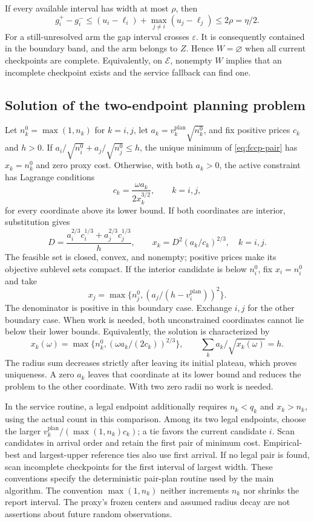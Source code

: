 \documentclass[11pt]{article}
\theoremstyle{remark}
\begin{document}
If every available interval has width at most $\rho$, then
\[
 g_i^+-g_i^-\le(u_i-\ell_i)+
                  \max_{j\ne i}(u_j-\ell_j)\le2\rho=\eta/2.
\]
For a still-unresolved arm the gap interval crosses $\varepsilon$.
It is consequently contained in the boundary band, and the arm belongs
to $Z$. Hence $W=\varnothing$ when all current checkpoints are complete.
Equivalently, on $\mathcal E$, nonempty $W$ implies that an incomplete
checkpoint exists and the service fallback can find one.

\subsection{Solution of the two-endpoint planning problem}
Let $n_k^0=\max(1,n_k)$ for $k=i,j$, let
$a_k=v_k^{\mathrm{plan}}\sqrt{n_k^0}$, and fix positive prices $c_k$
and $h>0$. If
$a_i/\sqrt{n_i^0}+a_j/\sqrt{n_j^0}\le h$, the unique minimum of
\eqref{eq:fccp-pair} has $x_k=n_k^0$ and zero proxy cost. Otherwise,
with both $a_k>0$, the active constraint has Lagrange conditions
\[
 c_k=\frac{\omega a_k}{2x_k^{3/2}},\qquad k=i,j,
\]
for every coordinate above its lower bound. If both coordinates are
interior, substitution gives
\begin{equation}\label{eq:fccp-pair-solution}
 D=\frac{a_i^{2/3}c_i^{1/3}+a_j^{2/3}c_j^{1/3}}h,\qquad
 x_k=D^2(a_k/c_k)^{2/3},\quad k=i,j.
\end{equation}
The feasible set is closed, convex, and nonempty; positive prices make
its objective sublevel sets compact. If the interior candidate is below
$n_i^0$, fix $x_i=n_i^0$ and take
\[
 x_j=\max\{n_j^0,(a_j/(h-v_i^{\mathrm{plan}}))^2\}.
\]
The denominator is positive in this boundary case. Exchange $i,j$ for
the other boundary case. When work is needed, both unconstrained
coordinates cannot lie below their lower bounds. Equivalently, the
solution is characterized by
\[
 x_k(\omega)=\max\{n_k^0,(\omega a_k/(2c_k))^{2/3}\},
 \qquad \sum_k a_k/\sqrt{x_k(\omega)}=h.
\]
The radius sum decreases strictly after leaving its initial plateau,
which proves uniqueness. A zero $a_k$ leaves that coordinate at its
lower bound and reduces the problem to the other coordinate. With two
zero radii no work is needed.

In the service routine, a legal endpoint additionally requires
$n_k<q_k$ and $x_k>n_k$, using the actual count in this comparison.
Among its two legal endpoints, choose the larger
$v_k^{\mathrm{plan}}/(\max(1,n_k)c_k)$; a tie favors the current
candidate $i$. Scan candidates in arrival order and retain the first
pair of minimum cost. Empirical-best and largest-upper reference ties
also use first arrival. If no legal pair is found, scan incomplete
checkpoints for the first interval of largest width. These conventions
specify the deterministic pair-plan routine used by the main algorithm.
The convention $\max(1,n_k)$ neither increments $n_k$ nor shrinks the
report interval. The proxy's frozen centers and assumed radius decay
are not assertions about future random observations.
\end{document}

